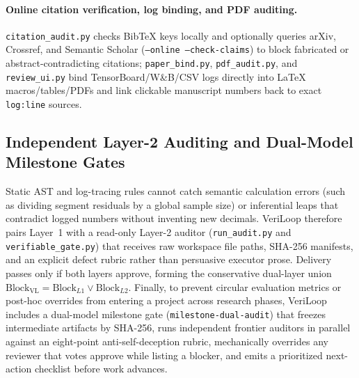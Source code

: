 \paragraph{Online citation verification, log binding, and PDF auditing.}
\texttt{citation\_audit.py} checks BibTeX keys locally and optionally queries arXiv, Crossref, and Semantic Scholar (\texttt{--online --check-claims}) to block fabricated or abstract-contradicting citations; \texttt{paper\_bind.py}, \texttt{pdf\_audit.py}, and \texttt{review\_ui.py} bind TensorBoard/W\&B/CSV logs directly into \LaTeX{} macros/tables/PDFs and link clickable manuscript numbers back to exact \texttt{log:line} sources.

\subsection{Independent Layer-2 Auditing and Dual-Model Milestone Gates}
\label{sec:layer2}

Static AST and log-tracing rules cannot catch semantic calculation errors (such as dividing segment residuals by a global sample size) or inferential leaps that contradict logged numbers without inventing new decimals.
VeriLoop therefore pairs Layer~1 with a read-only Layer-2 auditor (\texttt{run\_audit.py} and \texttt{verifiable\_gate.py}) that receives raw workspace file paths, SHA-256 manifests, and an explicit defect rubric rather than persuasive executor prose.
Delivery passes only if both layers approve, forming the conservative dual-layer union $\mathrm{Block}_{\text{VL}} = \mathrm{Block}_{L1} \lor \mathrm{Block}_{L2}$.
Finally, to prevent circular evaluation metrics or post-hoc overrides from entering a project across research phases, VeriLoop includes a dual-model milestone gate (\texttt{milestone-dual-audit}) that freezes intermediate artifacts by SHA-256, runs independent frontier auditors in parallel against an eight-point anti-self-deception rubric, mechanically overrides any reviewer that votes approve while listing a blocker, and emits a prioritized next-action checklist before work advances.
